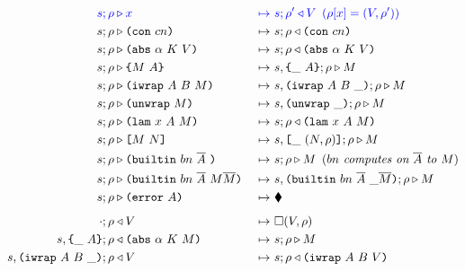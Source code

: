 \documentclass[../plutus-core-specification.tex]{subfiles}
\begin{document}
\begin{figure}[!ht]
  \ContinuedFloat
\begin{subfigure}[c]{\linewidth}  %
    \begin{alignat*}{2}
      \blue{s; \rho} & \bcompute \blue{x}          &~\bmapsto~&\blue{s;\rho^{\prime} \return V \enspace (\rho[x] = (V,\rho^{\prime}))} \\
       s; \rho &\compute \con{cn}                 &~\mapsto~& s;\rho \return \con{cn}\\
       s; \rho &\compute \abs{\alpha}{K}{V}       &~\mapsto~& s;\rho \return \abs{\alpha}{K}{V}\\
       s; \rho &\compute \inst{M}{A}              &~\mapsto~& s,\inInstLeftFrame{A};\rho \compute M\\
       s; \rho &\compute \wrap{A}{B}{M}           &~\mapsto~& s,\inWrapRightFrame{A}{B};\rho  \compute M\\ 
       s; \rho &\compute \unwrap{M}               &~\mapsto~& s,\inUnwrapFrame{};\rho  \compute M\\
       s; \rho &\compute \lam{x}{A}{M}            &~\mapsto~& s;\rho \return \lam{x}{A}{M}\\
       s; \rho &\compute \app{M}{N}               &~\mapsto~& s,\inAppLeftFrame{(N,\rho)};\rho \compute M\\
       s; \rho &\compute \builtin{bn}{\repetition{A}}{} &~\mapsto~& s;\rho \compute M \enspace (\textit{$bn$ computes on $\repetition{A}$ to $M$})\\
       s; \rho &\compute \builtin{bn}{\repetition{A}}{M \repetition{M}} &~\mapsto~& s,\inBuiltin{bn}{\repetition{A}}{}{\_}{\repetition{M}};\rho \compute M\\
       s; \rho &\compute \error{A}                &~\mapsto~& \ckerror{}\\
  \\[-10pt] %
       \cdot; \rho &\return V                     &~\mapsto~& \square (V, \rho)\\
       s,\inInstLeftFrame{A}; \rho                &\return \abs{\alpha}{K}{M} &~\mapsto~& s;\rho \compute{M} \\
       s,\inWrapRightFrame{A}{B}; \rho            &\return V &~\mapsto~& s;\rho \return \wrap{A}{B}{V}\\

\end{alignat*}
\end{subfigure}
\end{figure}
\end{document}
